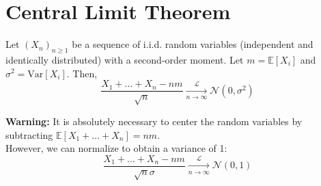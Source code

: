\section{Central Limit Theorem}%
\begin{theorem}
Let $(X_n)_{n \geq 1}$ be a sequence of i.i.d. random variables (independent and identically distributed) with a second-order moment. Let $m = \mathbb{E}[X_i]$ and $\sigma^2 = \text{Var}[X_i]$. Then,
\[ \frac{X_1 + \dots + X_n - nm}{\sqrt{n}} \xrightarrow[n \to \infty]{\mathcal{L}} \mathcal{N}(0, \sigma^2) \]
\end{theorem}%
\textbf{Warning:} It is absolutely necessary to center the random variables by subtracting $\mathbb{E}[X_1+\dots+X_n] = nm$.\\
However, we can normalize to obtain a variance of 1:
\[ \frac{X_1 + \dots + X_n - nm}{\sqrt{n}\sigma} \xrightarrow[n \to \infty]{\mathcal{L}} \mathcal{N}(0, 1) \]%
